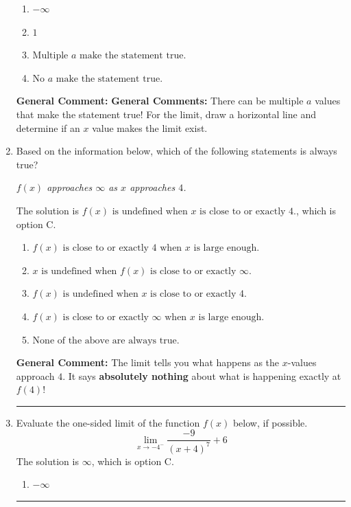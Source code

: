 \documentclass{extbook}[14pt]
\newcommand{\litem}[1]{\item #1

\rule{\textwidth}{0.4pt}}
\begin{document}
\begin{enumerate}
{\begin{enumerate}[label=\Alph*.]
\item \( -\infty \)


\item \( 1 \)


\item \( \text{Multiple } a \text{ make the statement true}. \)


\item \( \text{No } a \text{ make the statement true}. \)


\end{enumerate}

\textbf{General Comment:} \textbf{General Comments:} There can be multiple $a$ values that make the statement true! For the limit, draw a horizontal line and determine if an $x$ value makes the limit exist.
}
\litem{
Based on the information below, which of the following statements is always true?

\begin{center}
    \textit{ $f(x)$ approaches $\infty$ as $x$ approaches $4$. }
\end{center}
The solution is \( f(x) \text{ is undefined when } x \text{ is close to or exactly } 4. \), which is option C.\begin{enumerate}[label=\Alph*.]
\item \( f(x) \text{ is close to or exactly } 4 \text{ when } x \text{ is large enough}. \)


\item \( x \text{ is undefined when } f(x) \text{ is close to or exactly } \infty. \)


\item \( f(x) \text{ is undefined when } x \text{ is close to or exactly } 4. \)


\item \( f(x) \text{ is close to or exactly } \infty \text{ when } x \text{ is large enough}. \)


\item \( \text{None of the above are always true.} \)


\end{enumerate}

\textbf{General Comment:} The limit tells you what happens as the $x$-values approach $4$. It says \textbf{absolutely nothing} about what is happening exactly at $f(4)$!
}
\litem{
Evaluate the one-sided limit of the function $f(x)$ below, if possible.
\[ \lim_{x \rightarrow -4^-} \frac{-9}{(x+4)^7}+6 \]The solution is \( \infty \), which is option C.\begin{enumerate}[label=\Alph*.]
\item \( -\infty \)



\end{enumerate}}
\end{enumerate}
\end{document}
